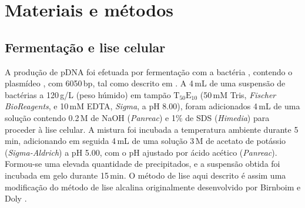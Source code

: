 \section{Materiais e métodos}
\subsection{Fermentação e lise celular}
A produção de pDNA foi efetuada por fermentação com a bactéria \ecolidh, contendo o plasmídeo \pVAX, com 6050\,bp, tal como descrito em \cite{sousabab}.
%
%
A 4\,mL de uma suspensão de bactérias a 120\,g/L (peso húmido) em tampão $\mathrm{T_{50}E_{10}}$ (50\,mM Tris, \emph{Fischer BioReagents}, e 10\,mM EDTA, \emph{Sigma}, a pH 8.00), foram adicionados 4\,mL de uma solução contendo 0.2\,M de NaOH (\emph{Panreac}) e 1\% de SDS (\emph{Himedia}) para proceder à lise celular.
%
%
%
%
%
%
A mistura foi incubada a temperatura ambiente durante 5\,min, adicionando em seguida 4\,mL de uma solução 3\,M de acetato de potássio (\emph{Sigma-Aldrich}) a pH 5.00, com o pH ajustado por ácido acético (\emph{Panreac}).
%
%
Formou-se uma elevada quantidade de precipitados, e a suspensão obtida foi incubada em gelo durante 15\,min.
%
O método de lise aqui descrito é assim uma modificação do método de lise alcalina originalmente desenvolvido por Birnboim e Doly \cite{birnboim}.

